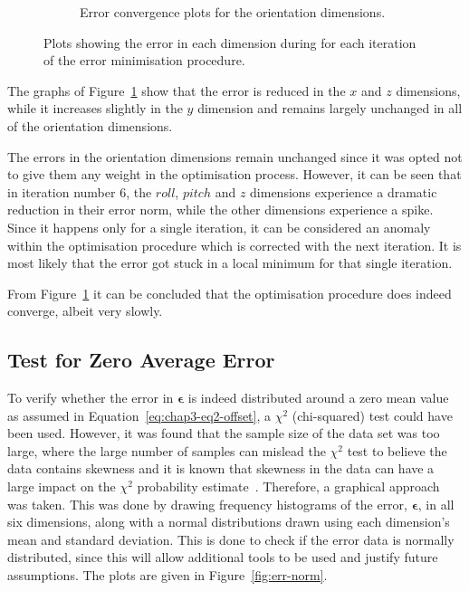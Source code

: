 \begin{figure}
\begin{subfigure}{0.48\textwidth}
\begin{subfigure}{\textwidth}
    \end{subfigure}
    \caption{Error convergence plots for the orientation dimensions.}
  \end{subfigure}
  \caption[Plots showing error convergence for the optimsation procedure.]{Plots showing the error in each dimension during for each iteration of the error minimisation procedure.}
  \label{fig:err-convergence}
\end{figure}

The graphs of Figure~\ref{fig:err-convergence} show that the error is reduced in the $x$ and $z$ dimensions, while it increases slightly in the $y$ dimension and remains largely unchanged in all of the orientation dimensions. 

The errors in the orientation dimensions remain unchanged since it was opted not to give them any weight in the optimisation process. However, it can be seen that in iteration number 6, the $roll$, $pitch$ and $z$ dimensions experience a dramatic reduction in their error norm, while the other dimensions experience a spike. Since it happens only for a single iteration, it can be considered an anomaly within the optimisation procedure which is corrected  with the next iteration. It is most likely that the error got stuck in a local minimum for that single iteration.  

From Figure~\ref{fig:err-convergence} it can be concluded that the optimisation procedure does indeed converge, albeit very slowly. 

\subsection{Test for Zero Average Error}
\label{sec:err-norm-test}

To verify whether the error in $\bm{\epsilon}$ is indeed distributed around a zero mean value as assumed in Equation~\ref{eq:chap3-eq2-offset}, a $\chi^2$ (chi-squared) test could have been used. However, it was found that the sample size of the data set was too large, where the large number of samples can mislead the $\chi^2$ test to believe the data contains skewness and it is known that skewness in the data can have a large impact on the $\chi^2$ probability estimate~\citep{wackerly2007mathematical}. Therefore, a graphical approach was taken. This was done by drawing frequency histograms of the error, $\bm{\epsilon}$, in all six dimensions, along with a normal distributions drawn using each dimension's mean and standard deviation. This is done to check if the error data is normally distributed, since this will allow additional tools to be used and justify future assumptions. The plots are given in Figure~\ref{fig:err-norm}.

